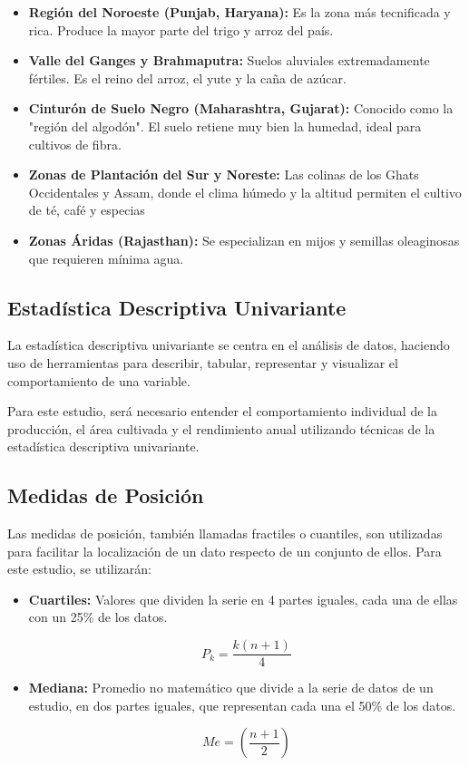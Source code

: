 \documentclass[oneside,11pt]{Latex/Classes/PhDthesisPSnPDF}
\begin{document}
\begin{itemize}

    \item{\textbf{Región del Noroeste (Punjab, Haryana):} Es la zona más tecnificada y rica. Produce la mayor parte del trigo y arroz del país.}
    \item{\textbf{Valle del Ganges y Brahmaputra:} Suelos aluviales extremadamente fértiles. Es el reino del arroz, el yute y la caña de azúcar.}
    \item{\textbf{Cinturón de Suelo Negro (Maharashtra, Gujarat):} Conocido como la "región del algodón". El suelo retiene muy bien la humedad, ideal para cultivos de fibra.}
    \item{\textbf{Zonas de Plantación del Sur y Noreste:} Las colinas de los Ghats Occidentales y Assam, donde el clima húmedo y la altitud permiten el cultivo de té, café y especias}
    \item{\textbf{Zonas Áridas (Rajasthan):} Se especializan en mijos y semillas oleaginosas que requieren mínima agua.}

\end{itemize}

\hfill\break

\subsection{Estadística Descriptiva Univariante}

La estadística descriptiva univariante se centra en el análisis de
datos, haciendo uso de herramientas para describir, tabular, representar
y visualizar el comportamiento de una variable.

Para este estudio, será necesario entender el comportamiento individual
de la producción, el área cultivada y el rendimiento anual utilizando
técnicas de la estadística descriptiva univariante.\\

\subsection*{Medidas de Posición}

Las medidas de posición, también llamadas fractiles o cuantiles, son
utilizadas para facilitar la localización de un dato respecto de un
conjunto de ellos. Para este estudio, se utilizarán:

\begin{itemize}
\item{\textbf{Cuartiles:} Valores que dividen la serie en 4 partes iguales, cada una de ellas con un 25\% de los datos.}

$$P_k = \frac{k(n + 1)}{4}$$

\item{\textbf{Mediana:} Promedio no matemático que divide a la serie de datos de un estudio, en dos partes iguales, que representan cada una el 50\% de los datos.}

$$Me = \left(\frac{n+1}{2}\right)$$
\end{itemize}
\end{document}
